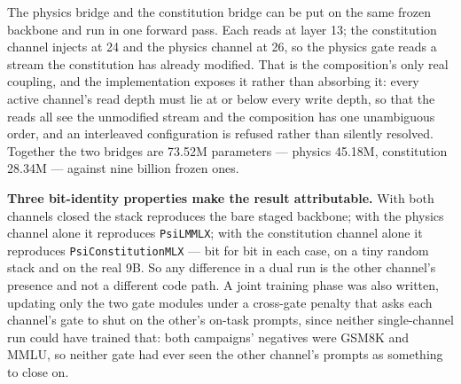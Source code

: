 \documentclass[11pt]{article}
\newcommand{\psilm}{$\Psi$LM}
\newcommand{\code}[1]{\texttt{#1}}
\begin{document}
The physics bridge and the constitution bridge can be put on the same frozen backbone and run in one forward pass. Each reads at layer 13; the constitution channel injects at 24 and the physics channel at 26, so the physics gate reads a stream the constitution has already modified. That is the composition's only real coupling, and the implementation exposes it rather than absorbing it: every active channel's read depth must lie at or below every write depth, so that the reads all see the unmodified stream and the composition has one unambiguous order, and an interleaved configuration is refused rather than silently resolved. Together the two bridges are 73.52M parameters --- physics 45.18M, constitution 28.34M --- against nine billion frozen ones.

\textbf{Three bit-identity properties make the result attributable.} With both channels closed the stack reproduces the bare staged backbone; with the physics channel alone it reproduces \code{PsiLMMLX}; with the constitution channel alone it reproduces \code{PsiConstitutionMLX} --- bit for bit in each case, on a tiny random stack and on the real 9B. So any difference in a dual run is the other channel's presence and not a different code path. A joint training phase was also written, updating only the two gate modules under a cross-gate penalty that asks each channel's gate to shut on the other's on-task prompts, since neither single-channel run could have trained that: both campaigns' negatives were GSM8K and MMLU, so neither gate had ever seen the other channel's prompts as something to close on.

\begin{table}[t]
\centering
\caption{\psilm{}-2 acceptance, $n = 50$ held-out red-team items and $n = 50$ held-out Burgers items, against the single-channel numbers the same harnesses produced (CE 0.3890, accuracy 1.000). ``Cost'' is the paired difference in per-item CE from opening the physics channel alongside the constitution channel.}
\label{tab:dual}
\small
{}
\end{table}
\end{document}
